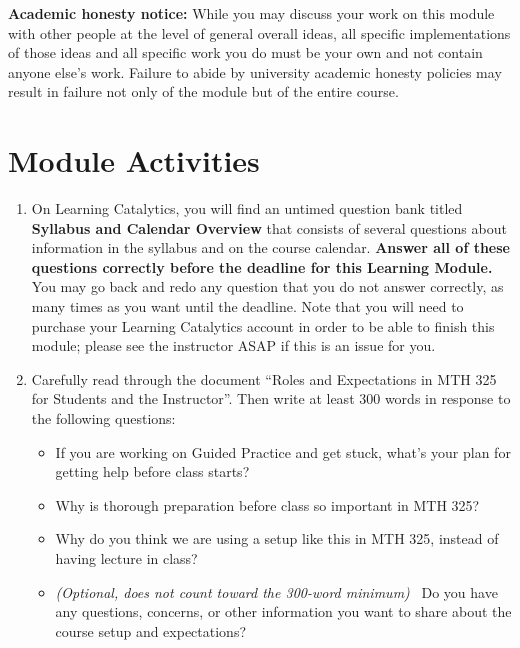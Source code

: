 \documentclass[11pt,letterpaper]{article}
\begin{document}
\smallskip

\textbf{Academic honesty notice:} While you may discuss your work on this module with other people at the level of general overall ideas, all specific implementations of those ideas and all specific work you do must be your own and not contain anyone else's work. Failure to abide by university academic honesty policies may result in failure not only of the module but of the entire course. 

\section*{Module Activities}

\begin{enumerate}
	\item On Learning Catalytics, you will find an untimed question bank titled \textbf{Syllabus and Calendar Overview} that consists of several questions about information in the syllabus and on the course calendar. \textbf{Answer all of these questions correctly before the deadline for this Learning Module.} You may go back and redo any question that you do not answer correctly, as many times as you want until the deadline. Note that you will need to purchase your Learning Catalytics account in order to be able to finish this module; please see the instructor ASAP if this is an issue for you. 

	\item Carefully read through the document ``Roles and Expectations in MTH 325 for Students and the Instructor''. Then write at least 300 words in response to the following questions: 
		\begin{itemize}
			\item If you are working on Guided Practice and get stuck, what's your plan for getting help before class starts? 
			\item Why is thorough preparation before class so important in MTH 325? 
			\item Why do you think we are using a setup like this in MTH 325, instead of having lecture in class? 
			\item \emph{(Optional, does not count toward the 300-word minimum)} \ Do you have any questions, concerns, or other information you want to share about the course setup and expectations? 
		\end{itemize}


\end{enumerate}
\end{document}
